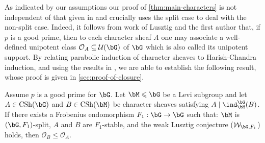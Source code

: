 \documentclass[eqthmnum,nocolour,skinny]{jt-calcs}
\DeclareMathOperator{\CS}{CSh}
\newcommand{\der}{\ensuremath{\mathrm{der}}}
\begin{document}
%

\begin{pa}
As indicated by our assumptions our proof of \cref{thm:main-characters} is not independent of that given in \cite{bezrukavnikov-liebeck-shalev-tiep:2017:character-bounds-grps-Lie-type} and crucially uses the split case to deal with the non-split case. Indeed, it follows from work of Lusztig \cite{lusztig:1992:a-unipotent-support} and the first author \cite{taylor:2016:GGGRs-small-characteristics} that, if $p$ is a good prime, then to each character sheaf $A$ one may associate a well-defined unipotent class $\mathcal{O}_A \subseteq \mathcal{U}(\bG)$ of $\bG$ which is also called its unipotent support. By relating parabolic induction of character sheaves to Harish-Chandra induction, and using the results in \cite{bezrukavnikov-liebeck-shalev-tiep:2017:character-bounds-grps-Lie-type}, we are able to establish the following result,
whose proof is given in \cref{sec:proof-of-closure}.
\end{pa}

\begin{thm}\label{thm:main-char-sheaves}
Assume $p$ is a good prime for $\bG$. Let $\bM \leqslant \bG$ be a Levi subgroup and let $A \in \CS(\bG)$ and $B \in \CS(\bM)$ be character sheaves satisfying $A \mid \ind_{\bM}^{\bG}(B)$. If there exists a Frobenius endomorphism $F_1 : \bG \to \bG$ such that: $\bM$ is $(\bG,F_1)$-split, $A$ and $B$ are $F_1$-stable, and the weak Lusztig conjecture ($\mathcal{W}_{\bG,F_1}$) holds, then $\mathcal{O}_B \leqslant \mathcal{O}_A$.
\end{thm}
\end{document}
